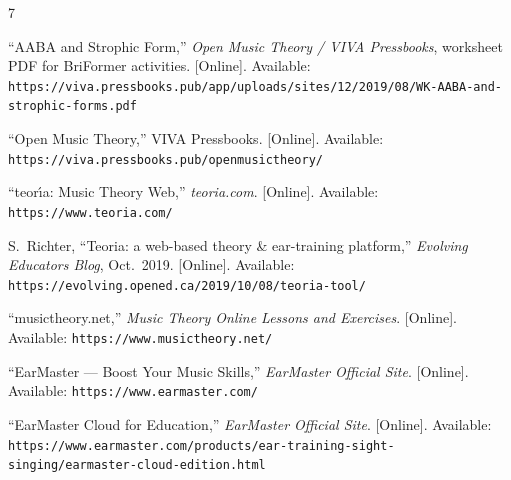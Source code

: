 \documentclass[12pt, letterpaper]{article}
\begin{document}
\begin{thebibliography}{7}

``AABA and Strophic Form,'' \emph{Open Music Theory / VIVA Pressbooks}, worksheet PDF for BriFormer activities. [Online]. Available:
\texttt{https://viva.pressbooks.pub/app/uploads/sites/12/2019/08/WK-AABA-and-strophic-forms.pdf}

``Open Music Theory,'' VIVA Pressbooks. [Online]. Available:
\texttt{https://viva.pressbooks.pub/openmusictheory/}

``teor\'{\i}a: Music Theory Web,'' \emph{teoria.com}. [Online]. Available:
\texttt{https://www.teoria.com/}

S.~Richter, ``Teoria: a web-based theory \& ear-training platform,'' \emph{Evolving Educators Blog}, Oct.~2019. [Online]. Available:
\texttt{https://evolving.opened.ca/2019/10/08/teoria-tool/}

``musictheory.net,'' \emph{Music Theory Online Lessons and Exercises}. [Online]. Available:
\texttt{https://www.musictheory.net/}

``EarMaster --- Boost Your Music Skills,'' \emph{EarMaster Official Site}. [Online]. Available:
\texttt{https://www.earmaster.com/}

``EarMaster Cloud for Education,'' \emph{EarMaster Official Site}. [Online]. Available:
\texttt{https://www.earmaster.com/products/ear-training-sight-singing/earmaster-cloud-edition.html}

\end{thebibliography}
\end{document}
